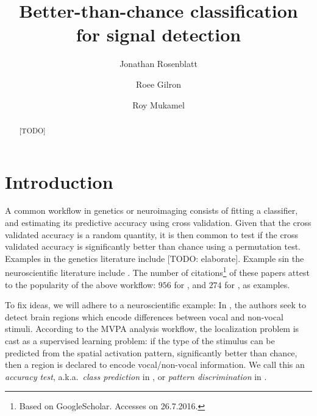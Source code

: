 \documentclass[12pt,a4paper]{article}
\author{Jonathan Rosenblatt \and Roee Gilron \and Roy Mukamel}
\title{Better-than-chance classification for signal detection}
\begin{document}


\maketitle
\linenumbers

\begin{abstract}
[TODO]
\end{abstract}


\section{Introduction}
\label{sec:introduction}






A common workflow in genetics or neuroimaging consists of fitting a classifier, and estimating its predictive accuracy using cross validation. 
Given that the cross validated accuracy is a random quantity, it is then common to test if the cross validated accuracy is significantly better than chance using a permutation test.  
Examples in the genetics literature include \cite{jiang_calculating_2008,radmacher_paradigm_2002} [TODO: elaborate].
Example sin the neuroscientific literature include \citep{golland_permutation_2003,kriegeskorte_information-based_2006,pereira_machine_2009,varoquaux_assessing_2016}.
The number of citations\footnote{Based on GoogleScholar. Accesses on 26.7.2016.} of these papers attest to the popularity of the above workflow: $956$ for \cite{kriegeskorte_information-based_2006}, and $274$ for \cite{radmacher_paradigm_2002}, as examples. 


To fix ideas, we will adhere to a neuroscientific example: 
In \cite{gilron_quantifying_2016}, the authors seek to detect brain regions which encode differences between vocal and non-vocal stimuli. 
According to the MVPA analysis workflow, the localization problem is cast as a supervised learning problem: if the type of the stimulus can be predicted from the spatial activation pattern, significantly better than chance, then a region is declared to encode vocal/non-vocal information. 
We call this an \emph{accuracy test}, a.k.a.\ \emph{class prediction} in \cite{simon_pitfalls_2003}, or \emph{pattern discrimination} in \cite{pereira_machine_2009}.
\end{document}
